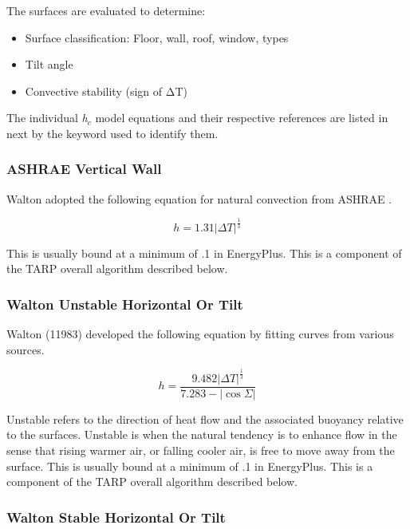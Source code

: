 The surfaces are evaluated to determine:

\begin{itemize}
\item
  Surface classification: Floor, wall, roof, window, types
\item
  Tilt angle
\item
  Convective stability (sign of ΔT)
\end{itemize}

The individual \emph{h\(_{c}\)} model equations and their respective references are listed in next by the keyword used to identify them.

\subsubsection{ASHRAE Vertical Wall}\label{ashrae-vertical-wall}

Walton adopted the following equation for natural convection from ASHRAE .

\begin{equation}
h = 1.31{\left| {\Delta T} \right|^{\frac{1}{3}}}
\end{equation}

This is usually bound at a minimum of .1 in EnergyPlus. This is a component of the TARP overall algorithm described below.

\subsubsection{Walton Unstable Horizontal Or Tilt}\label{walton-unstable-horizontal-or-tilt}

Walton (11983) developed the following equation by fitting curves from various sources.

\begin{equation}
h = \frac{{9.482{{\left| {\Delta T} \right|}^{\frac{1}{3}}}}}{{7.283 - \left| {\cos \Sigma } \right|}}
\end{equation}

Unstable refers to the direction of heat flow and the associated buoyancy relative to the surfaces. Unstable is when the natural tendency is to enhance flow in the sense that rising warmer air, or falling cooler air, is free to move away from the surface. This is usually bound at a minimum of .1 in EnergyPlus. This is a component of the TARP overall algorithm described below.

\subsubsection{Walton Stable Horizontal Or Tilt}\label{walton-stable-horizontal-or-tilt}

